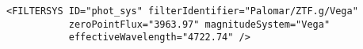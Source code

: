 \noindent
\begingroup\footnotesize
\begin{tcolorbox}
\begin{verbatim}
<FILTERSYS ID="phot_sys" filterIdentifier="Palomar/ZTF.g/Vega" 
           zeroPointFlux="3963.97" magnitudeSystem="Vega" 
           effectiveWavelength="4722.74" />
\end{verbatim}
\end{tcolorbox}
\endgroup

